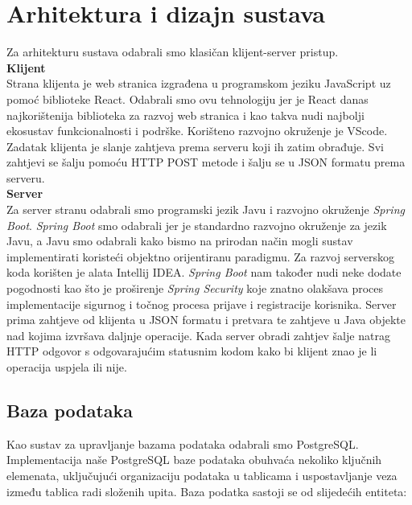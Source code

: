 \chapter{Arhitektura i dizajn sustava}
		
	Za arhitekturu sustava odabrali smo klasičan klijent-server pristup. \\
	
	\textbf{Klijent}\\
	Strana klijenta je web stranica izgrađena u programskom jeziku JavaScript uz pomoć biblioteke React. Odabrali smo ovu tehnologiju jer je React danas najkorištenija biblioteka za razvoj web stranica i kao takva nudi najbolji ekosustav funkcionalnosti i podrške. Korišteno razvojno okruženje je VScode. Zadatak klijenta je slanje zahtjeva prema serveru koji ih zatim obrađuje. Svi zahtjevi se šalju pomoću HTTP POST metode i šalju se u JSON formatu prema serveru.\\
	
	\textbf{Server}\\
	Za server stranu odabrali smo programski jezik Javu i razvojno okruženje \textit{Spring Boot}. \textit{Spring Boot} smo odabrali jer je standardno razvojno okruženje za jezik Javu, a Javu smo odabrali kako bismo na prirodan način mogli sustav implementirati koristeći objektno orijentiranu paradigmu. Za razvoj serverskog koda korišten je alata Intellij IDEA. \textit{Spring Boot} nam također nudi neke dodate pogodnosti kao što je proširenje \textit{Spring Security} koje znatno olakšava proces implementacije sigurnog i točnog procesa prijave i registracije korisnika. Server prima zahtjeve od klijenta u JSON formatu i pretvara te zahtjeve u Java objekte nad kojima izvršava daljnje operacije. Kada server obradi zahtjev šalje natrag HTTP odgovor s odgovarajućim statusnim kodom kako bi klijent znao je li operacija uspjela ili nije.
		

		

				
		\section{Baza podataka}
			
		 Kao sustav za upravljanje bazama podataka odabrali smo PostgreSQL. Implementacija naše PostgreSQL baze podataka obuhvaća nekoliko ključnih elemenata, uključujući organizaciju podataka u tablicama i uspostavljanje veza između tablica radi složenih upita. Baza podatka sastoji se od slijedećih entiteta: 
		
